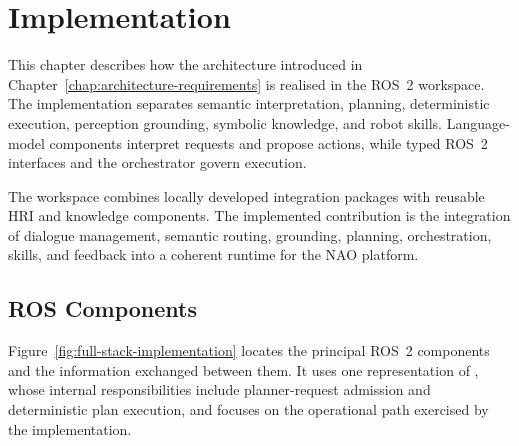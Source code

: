 \chapter{Implementation}
\label{chap:implementation}
\label{sec:implementation}

This chapter describes how the architecture introduced in Chapter~\ref{chap:architecture-requirements} is realised in the ROS~2 workspace. The implementation separates semantic interpretation, planning, deterministic execution, perception grounding, symbolic knowledge, and robot skills. Language-model components interpret requests and propose actions, while typed ROS~2 interfaces and the orchestrator govern execution.

The workspace combines locally developed integration packages with reusable HRI and knowledge components. The implemented contribution is the integration of dialogue management, semantic routing, grounding, planning, orchestration, skills, and feedback into a coherent runtime for the NAO platform.



\section{ROS Components}

Figure~\ref{fig:full-stack-implementation} locates the principal ROS~2 components and the information exchanged between them. It uses one representation of , whose internal responsibilities include planner-request admission and deterministic plan execution, and focuses on the operational path exercised by the implementation.

